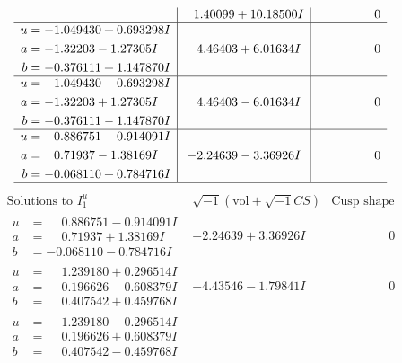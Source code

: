 \documentclass[1p]{elsarticle_modified}
\theoremstyle{definition}
\newcommand{\I}{\sqrt{-1}}
\begin{document}
$$\begin{array}{c|c|c}
 & \phantom{-}1.40099 + 10.18500 I & \phantom{-0.000000 } 0 \\ \hline\begin{aligned}
u &= -1.049430 + 0.693298 I \\
a &= -1.32203 - 1.27305 I \\
b &= -0.376111 + 1.147870 I\end{aligned}
 & \phantom{-}4.46403 + 6.01634 I & \phantom{-0.000000 } 0 \\ \hline\begin{aligned}
u &= -1.049430 - 0.693298 I \\
a &= -1.32203 + 1.27305 I \\
b &= -0.376111 - 1.147870 I\end{aligned}
 & \phantom{-}4.46403 - 6.01634 I & \phantom{-0.000000 } 0 \\ \hline\begin{aligned}
u &= \phantom{-}0.886751 + 0.914091 I \\
a &= \phantom{-}0.71937 - 1.38169 I \\
b &= -0.068110 + 0.784716 I\end{aligned}
 & -2.24639 - 3.36926 I & \phantom{-0.000000 } 0\\
 \hline 
 \end{array}$$\newpage$$\begin{array}{c|c|c}  
\text{Solutions to }I^u_{1}& \I (\text{vol} + \sqrt{-1}CS) & \text{Cusp shape}\\
 \hline 
\begin{aligned}
u &= \phantom{-}0.886751 - 0.914091 I \\
a &= \phantom{-}0.71937 + 1.38169 I \\
b &= -0.068110 - 0.784716 I\end{aligned}
 & -2.24639 + 3.36926 I & \phantom{-0.000000 } 0 \\ \hline\begin{aligned}
u &= \phantom{-}1.239180 + 0.296514 I \\
a &= \phantom{-}0.196626 - 0.608379 I \\
b &= \phantom{-}0.407542 + 0.459768 I\end{aligned}
 & -4.43546 - 1.79841 I & \phantom{-0.000000 } 0 \\ \hline\begin{aligned}
u &= \phantom{-}1.239180 - 0.296514 I \\
a &= \phantom{-}0.196626 + 0.608379 I \\
b &= \phantom{-}0.407542 - 0.459768 I\end{aligned}

\end{array}$$
\end{document}
